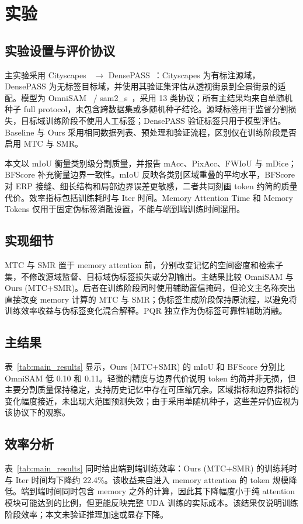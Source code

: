\section{实验}
\label{sec:experiments}

\subsection{实验设置与评价协议}
主实验采用 Cityscapes~\cite{cordts2016cityscapes} $\rightarrow$ DensePASS~\cite{ma2021densepass}：Cityscapes 为有标注源域，DensePASS 为无标签目标域，并使用其验证集评估从透视街景到全景街景的适配。模型为 OmniSAM~\cite{zhong2025omnisam} / sam2\_s~\cite{ravi2025sam2}，采用 13 类协议；所有主结果均来自单随机种子 full protocol，未包含跨数据集或多随机种子结论。源域标签用于监督分割损失，目标域训练阶段不使用人工标签；DensePASS 验证标签只用于模型评估。Baseline 与 Ours 采用相同数据列表、预处理和验证流程，区别仅在训练阶段是否启用 MTC 与 SMR。

本文以 mIoU 衡量类别级分割质量，并报告 mAcc、PixAcc、FWIoU 与 mDice；BFScore 补充衡量边界一致性。mIoU 反映各类别区域重叠的平均水平，BFScore 对 ERP 接缝、细长结构和局部边界误差更敏感，二者共同刻画 token 约简的质量代价。效率指标包括训练耗时与 Iter 时间。Memory Attention Time 和 Memory Tokens 仅用于固定伪标签消融设置，不能与端到端训练时间混用。

\subsection{实现细节}
MTC 与 SMR 置于 memory attention 前，分别改变记忆的空间密度和检索子集，不修改源域监督、目标域伪标签损失或分割输出。主结果比较 OmniSAM 与 Ours (MTC+SMR)。后者在训练阶段同时使用辅助置信掩码，但论文主名称突出直接改变 memory 计算的 MTC 与 SMR；伪标签生成阶段保持原流程，以避免将训练效率收益与伪标签变化混合解释。PQR 独立作为伪标签可靠性辅助消融。

\subsection{主结果}


表~\ref{tab:main_results} 显示，Ours (MTC+SMR) 的 mIoU 和 BFScore 分别比 OmniSAM 低 0.10 和 0.11。轻微的精度与边界代价说明 token 约简并非无损，但主要分割质量保持稳定，支持历史记忆中存在可压缩冗余。区域指标和边界指标的变化幅度接近，未出现大范围预测失效；由于采用单随机种子，这些差异仍应视为该协议下的观察。

\subsection{效率分析}
表~\ref{tab:main_results} 同时给出端到端训练效率：Ours (MTC+SMR) 的训练耗时与 Iter 时间均下降约 22.4\%。该收益来自进入 memory attention 的 token 规模降低。端到端时间同时包含 memory 之外的计算，因此其下降幅度小于纯 attention 模块可能达到的比例，但更能反映完整 UDA 训练的实际成本。该结果仅说明训练阶段效率；本文未验证推理加速或显存下降。

